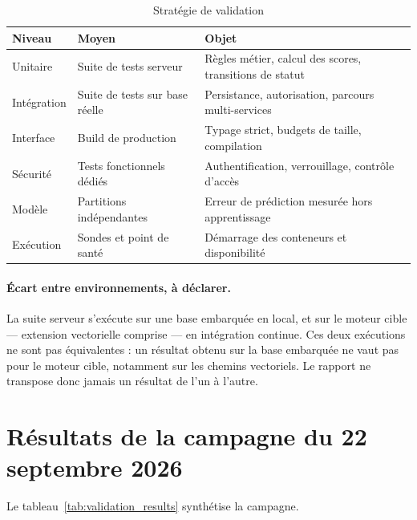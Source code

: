 \begin{table}[htbp]
  \centering
  \caption{Stratégie de validation}
  \label{tab:val_strategy}
  \begin{tabularx}{\textwidth}{L{3.2cm} L{3.4cm} X}
    \toprule
    \textbf{Niveau} & \textbf{Moyen} & \textbf{Objet} \\
    \midrule
    Unitaire        & Suite de tests serveur & Règles métier, calcul des scores, transitions de statut \\
    Intégration     & Suite de tests sur base réelle & Persistance, autorisation, parcours multi-services \\
    Interface       & Build de production & Typage strict, budgets de taille, compilation \\
    Sécurité        & Tests fonctionnels dédiés & Authentification, verrouillage, contrôle d'accès \\
    Modèle          & Partitions indépendantes & Erreur de prédiction mesurée hors apprentissage \\
    Exécution       & Sondes et point de santé & Démarrage des conteneurs et disponibilité \\
    \bottomrule
  \end{tabularx}
\end{table}

\paragraph{Écart entre environnements, à déclarer.} La suite serveur s'exécute
sur une base embarquée en local, et sur le moteur cible — extension vectorielle
comprise — en intégration continue. Ces deux exécutions ne sont pas
équivalentes : un résultat obtenu sur la base embarquée ne vaut pas pour le
moteur cible, notamment sur les chemins vectoriels. Le rapport ne transpose
donc jamais un résultat de l'un à l'autre.

\section{Résultats de la campagne du 22 septembre 2026}
\label{sec:validation_results}

Le tableau~\ref{tab:validation_results} synthétise la campagne.

